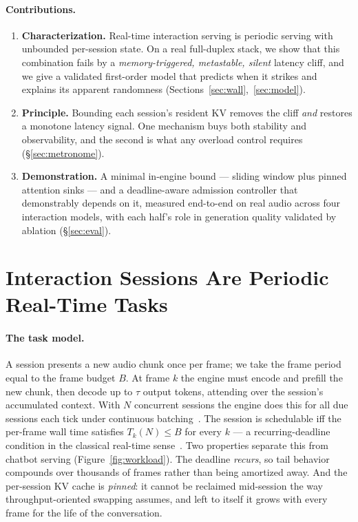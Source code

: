

\paragraph{Contributions.}
\begin{enumerate}[leftmargin=1.4em,itemsep=2pt]
\item \textbf{Characterization.} Real-time interaction serving is periodic serving with unbounded
per-session state. On a real full-duplex stack, we show that this combination fails by a
\emph{memory-triggered, metastable, silent} latency cliff, and we give a validated first-order model
that predicts when it strikes and explains its apparent randomness
(Sections~\ref{sec:wall},~\ref{sec:model}).
\item \textbf{Principle.} Bounding each session's resident KV removes the cliff \emph{and} restores a
monotone latency signal. One mechanism buys both stability and observability, and the second is what any
overload control requires (\S\ref{sec:metronome}).
\item \textbf{Demonstration.} A minimal in-engine bound --- sliding window plus pinned attention
sinks --- and a deadline-aware admission controller that demonstrably depends on it, measured
end-to-end on real audio across four interaction models, with each half's role in generation quality
validated by ablation (\S\ref{sec:eval}).
\end{enumerate}

\section{Interaction Sessions Are Periodic Real-Time Tasks}
\label{sec:bg}



\paragraph{The task model.} A session presents a new audio chunk once per frame; we take the frame
period equal to the frame budget $B$. At frame $k$ the engine must encode and prefill the new chunk, then
decode up to $\tau$ output tokens, attending over the session's accumulated context. With $N$ concurrent
sessions the engine does this for all due sessions each tick under continuous batching~\citep{orca}. The
session is schedulable iff the per-frame wall time satisfies $T_k(N)\le B$ for every $k$ --- a
recurring-deadline condition in the classical real-time sense~\citep{liulayland}. Two properties separate
this from chatbot serving (Figure~\ref{fig:workload}). The deadline \emph{recurs}, so tail behavior
compounds over thousands of frames rather than being amortized away. And the per-session KV cache is
\emph{pinned}: it cannot be reclaimed mid-session the way throughput-oriented swapping assumes, and left
to itself it grows with every frame for the life of the conversation.

